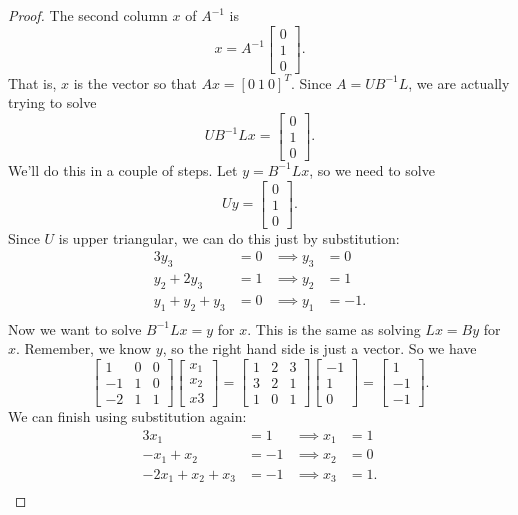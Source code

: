 \documentclass{article}
\theoremstyle{definition}
\begin{document}
\begin{proof}
	The second column $x$ of $A^{-1}$ is 
	\[x=A^{-1}\begin{bmatrix}
		0 \\ 1\\0
	\end{bmatrix}.\] That is, $x$ is the vector so that $Ax=[0~1~0]^T$. Since $A=U B^{-1}L$, we are actually trying to solve
\[U B^{-1}L x =\begin{bmatrix}
	0 \\ 1\\0
\end{bmatrix}.\]
We'll do this in a couple of steps. Let $y= B^{-1}L x$, so we need to solve
\[U y =\begin{bmatrix}
0 \\ 1\\0
\end{bmatrix}.\]
Since $U$ is upper triangular, we can do this just by substitution: 
\begin{alignat*}{3}
	y_3&=0 &\implies y_3 &=0\\
	y_2 + 2 y_3&=1& \implies y_2&=1\\
		y_1+y_2 +  y_3&=0& \implies y_1&=-1.\\
\end{alignat*}
Now we want to solve $B^{-1}Lx=y$ for $x$. This is the same as solving $Lx=By$ for $x$. Remember, we know $y$, so the right hand side is just a vector. So we have 
\[\begin{bmatrix}
	1 & 0& 0\\
	-1 & 1 & 0\\
	-2 & 1& 1
\end{bmatrix} \begin{bmatrix}
x_1\\x_2\\x3
\end{bmatrix}= \begin{bmatrix}
1 & 2 & 3\\
3 & 2 & 1\\
1 & 0 & 1
\end{bmatrix}\begin{bmatrix}
-1\\1\\0
\end{bmatrix} = \begin{bmatrix}
1 \\-1\\-1
\end{bmatrix}.\]
We can finish using substitution again:
\begin{alignat*}{3}
	x_1&=1 &\implies x_1 &=1\\
	-x_1 + x_2&=-1& \implies x_2&=0\\
	-2 x_1 + x_2 + x_3&=-1& \implies x_3&=1.\\
\end{alignat*}
\end{proof}
\end{document}
